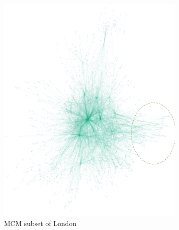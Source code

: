 \begin{figure}[H]
\begin{subfigure}[b]{0.495\textwidth}
          \includegraphics[width=\textwidth]{figures_c1/graph_compare/london.png}
          \caption{MCM subset of London}
          \label{fig:london}
      \end{subfigure}
       \hfill
        \begin{subfigure}[b]{0.495\textwidth}
           \centering

\end{subfigure}
\end{figure}
